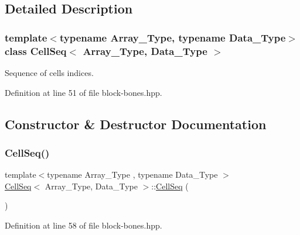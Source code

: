 \subsection{Detailed Description}
\subsubsection*{template$<$typename Array\+\_\+\+Type, typename Data\+\_\+\+Type$>$\newline
class Cell\+Seq$<$ Array\+\_\+\+Type, Data\+\_\+\+Type $>$}

Sequence of cells indices. 



Definition at line 51 of file block-\/bones.\+hpp.



\subsection{Constructor \& Destructor Documentation}
\mbox{\label{class_cell_seq_a1668f6f6768838864d1a85f018be2aa6}} 
\subsubsection{\texorpdfstring{Cell\+Seq()}{CellSeq()}\hspace{0.1cm}{\footnotesize\ttfamily [1/2]}}
{\footnotesize\ttfamily template$<$typename Array\+\_\+\+Type , typename Data\+\_\+\+Type $>$ \\
\hyperlink{class_cell_seq}{Cell\+Seq}$<$ Array\+\_\+\+Type, Data\+\_\+\+Type $>$\+::\hyperlink{class_cell_seq}{Cell\+Seq} (\begin{DoxyParamCaption}{ }\end{DoxyParamCaption})\hspace{0.3cm}{\ttfamily [inline]}}



Definition at line 58 of file block-\/bones.\+hpp.

\mbox{\label{class_cell_seq_aa08a1ebbb81673baea62c9eb91946f4d}} 
